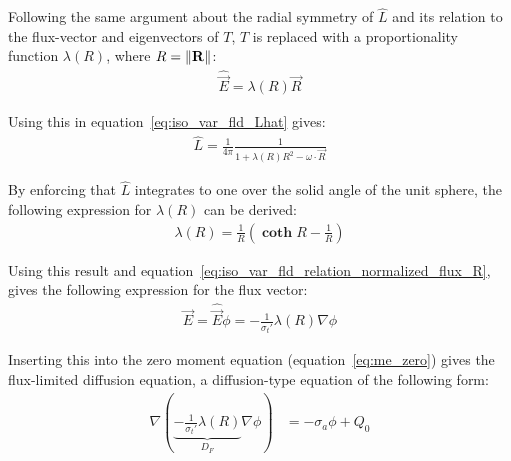 Following the same argument about the radial symmetry of $\hat{L}$ and its relation to the flux-vector and eigenvectors of $T$, $T$ is replaced with a proportionality function $\lambda(R)$, where $R=\left\lVert\mathbf{R}\right\rVert$:
\begin{align}
\widehat{\vec{E}} = \lambda(R)\vec{R}
\label{eq:iso_var_fld_relation_normalized_flux_R}
\end{align}

Using this in equation~\ref{eq:iso_var_fld_Lhat} gives:
\begin{align}
\label{eq:iso_var_fld_Lhat_R}
\hat{L} = \frac{1}{4\pi}\frac{1}{1+\lambda(R)R^2-\omega\cdot\vec{R}}
\end{align}

By enforcing that $\hat{L}$ integrates to one over the solid angle of the unit sphere, the following expression for $\lambda(R)$ can be derived:
\begin{align}
\label{eq:iso_var_fld_lambdaR}
\lambda(R) = \frac{1}{R}\left(\mathbf{\operatorname{coth}}R - \frac{1}{R}\right)
\end{align}

Using this result and equation~\ref{eq:iso_var_fld_relation_normalized_flux_R}, gives the following expression for the flux vector:
\begin{align}
\label{eq:iso_var_fld_fluxvector}
\vec{E} = \widehat{\vec{E}}\phi=-\frac{1}{\sigma_t'}\lambda(R)\nabla\phi
\end{align}

Inserting this into the zero moment equation (equation~\ref{eq:me_zero}) gives the flux-limited diffusion equation, a diffusion-type equation of the following form:
\begin{align}
\label{eq:iso_var_fld_final}
\nabla\left( \underbrace{-\frac{1}{\sigma_t'}\lambda(R)}_{D_F}\nabla\phi\right) &= -\sigma_a\phi + Q_0
\end{align}

